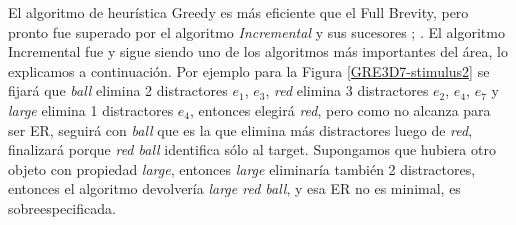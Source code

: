 El algoritmo de heur\'istica Greedy es m\'as eficiente que el Full Brevity, pero pronto fue superado por el algoritmo {\it Incremental} y sus sucesores \cite{C92-1038}; \cite{Dale95computationalinterpretations}. El algoritmo Incremental fue y sigue siendo uno de los algoritmos m\'as importantes del \'area, lo explicamos a continuaci\'on. Por ejemplo para la Figura \ref{GRE3D7-stimulus2} se fijar\'a que {\it ball} elimina 2 distractores {$e_{1}$, $e_{3}$}, {\it red} elimina 3 distractores {$e_{2}$, $e_{4}$, $e_{7}$} y {\it large} elimina 1 distractores {$e_{4}$}, entonces elegir\'a {\it red}, pero como no alcanza para ser ER, seguir\'a con {\it ball} que es la que elimina m\'as distractores luego de {\it red}, finalizar\'a porque {\it red ball} identifica s\'olo al target. Supongamos que hubiera otro objeto con propiedad {\it large}, entonces {\it large} eliminar\'ia tambi\'en 2 distractores, entonces el algoritmo devolver\'ia {\it large red ball}, y esa ER no es minimal, es sobreespecificada.




